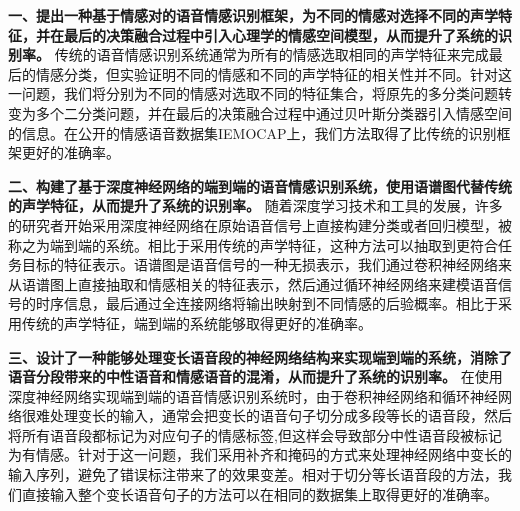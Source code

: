 \textbf{一、提出一种基于情感对的语音情感识别框架，为不同的情感对选择不同的声学特征，并在最后的决策融合过程中引入心理学的情感空间模型，从而提升了系统的识别率。} 传统的语音情感识别系统通常为所有的情感选取相同的声学特征来完成最后的情感分类，但实验证明不同的情感和不同的声学特征的相关性并不同。针对这一问题，我们将分别为不同的情感对选取不同的特征集合，将原先的多分类问题转变为多个二分类问题，并在最后的决策融合过程中通过贝叶斯分类器引入情感空间的信息。在公开的情感语音数据集IEMOCAP上，我们方法取得了比传统的识别框架更好的准确率。

\textbf{二、构建了基于深度神经网络的端到端的语音情感识别系统，使用语谱图代替传统的声学特征，从而提升了系统的识别率。} 随着深度学习技术和工具的发展，许多的研究者开始采用深度神经网络在原始语音信号上直接构建分类或者回归模型，被称之为端到端的系统。相比于采用传统的声学特征，这种方法可以抽取到更符合任务目标的特征表示。语谱图是语音信号的一种无损表示，我们通过卷积神经网络来从语谱图上直接抽取和情感相关的特征表示，然后通过循环神经网络来建模语音信号的时序信息，最后通过全连接网络将输出映射到不同情感的后验概率。相比于采用传统的声学特征，端到端的系统能够取得更好的准确率。

\textbf{三、设计了一种能够处理变长语音段的神经网络结构来实现端到端的系统，消除了语音分段带来的中性语音和情感语音的混淆，从而提升了系统的识别率。} 在使用深度神经网络实现端到端的语音情感识别系统时，由于卷积神经网络和循环神经网络很难处理变长的输入，通常会把变长的语音句子切分成多段等长的语音段，然后将所有语音段都标记为对应句子的情感标签,但这样会导致部分中性语音段被标记为有情感。针对于这一问题，我们采用补齐和掩码的方式来处理神经网络中变长的输入序列，避免了错误标注带来了的效果变差。相对于切分等长语音段的方法，我们直接输入整个变长语音句子的方法可以在相同的数据集上取得更好的准确率。




